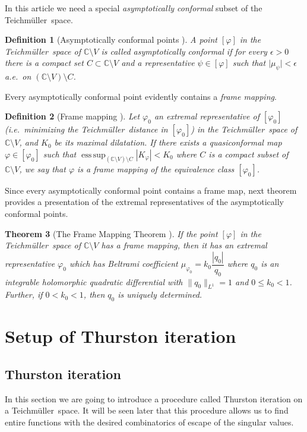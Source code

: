 \documentclass[10pt,reqno,a4paper]{amsart}
\numberwithin{figure}{section}
\numberwithin{equation}{section}
\newtheorem{thm}{Theorem}[section]
\newtheorem{defn}[thm]{Definition}
\newcommand{\tei}{Teichm\"uller}
\DeclareMathOperator*{\esssup}{ess\,sup}
\newcommand{\abs}[1]{\lvert #1 \rvert}
\begin{document}
In this article we need a special \emph{asymptotically conformal} subset of the \tei\ space.

\begin{defn}[Asymptotically conformal points \cite{Gardiner}]
	\label{defn:as_conformal}
	A point $[\varphi]$ in the \tei\ space of $\mathbb{C}\setminus V$ is called \emph{asymptotically conformal} if for every $\epsilon>0$ there is a compact set $C\subset\mathbb{C}\setminus V$ and a representative $\psi\in[\varphi]$ such that $\abs{\mu_\psi}<\epsilon$ a.e.\ on $(\mathbb{C}\setminus V)\setminus C$.
\end{defn}

Every asymptotically conformal point evidently contains a \emph{frame mapping}.

\begin{defn}[Frame mapping \cite{Gardiner}]
	\label{defn:frame_mapping}
	Let $\varphi_0$ an extremal representative of $[\varphi_0]$ (i.e.\ minimizing the \tei\ distance in $[\varphi_0]$) in the \tei\ space of $\mathbb{C}\setminus V$, and $K_0$ be its maximal dilatation. If there exists a quasiconformal map $\varphi\in[\varphi_0]$ such that $\esssup_{(\mathbb{C}\setminus V) \setminus C}|K_\varphi| <K_0$ where $C$ is a compact subset of $\mathbb{C}\setminus V$, we say that $ \varphi $ is a frame mapping of the equivalence class $[\varphi_0]$.
\end{defn}

Since every asymptotically conformal point contains a frame map, next theorem provides a presentation of the extremal representatives of the asymptotically conformal points.

\begin{thm}[The Frame Mapping Theorem \cite{Gardiner}]
	\label{thm:frame_mapping_theorem}
	If the point $[\varphi]$ in the \tei\ space of $\mathbb{C}\setminus V$ has a frame mapping, then it has an extremal representative $\varphi_0$ which has Beltrami coefficient $\mu_{\varphi_0}=k_0 \dfrac{|q_0|}{q_0}$ where $q_0$ is an integrable holomorphic quadratic differential with $\|q_0\|_{L^1}=1$ and $0\leq k_0<1$. Further, if $ 0< k_0<1 $, then $ q_0 $ is uniquely determined.
\end{thm}

\section{Setup of Thurston iteration}
\label{sec:iteration_setup}

\subsection{Thurston iteration}
\label{subsec:iteration_setup}
In this section we are going to introduce a procedure called Thurston iteration on a \tei\ space. It will be seen later that this procedure allows us to find entire functions with the desired combinatorics of escape of the singular values.
\end{document}
